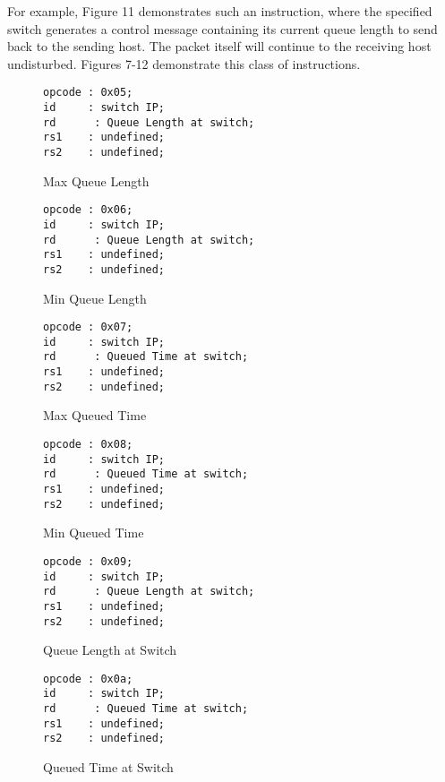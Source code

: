 For example, Figure 11 demonstrates such an instruction, where the specified switch generates a control message containing its current queue length to send back to the sending host. The packet itself will continue to the receiving host undisturbed. Figures 7-12 demonstrate this class of instructions.

\begin{figure}[tp]
\centering
\begin{verbatim}
opcode : 0x05;
id     : switch IP;
rd	    : Queue Length at switch;
rs1	   : undefined;
rs2	   : undefined;
\end{verbatim}
\caption{Max Queue Length}
\end{figure}

\begin{figure}[tp]
\centering
\begin{verbatim}
opcode : 0x06;
id     : switch IP;
rd	    : Queue Length at switch;
rs1	   : undefined;
rs2	   : undefined;
\end{verbatim}
\caption{Min Queue Length}
\end{figure}

\begin{figure}[tp]
\centering
\begin{verbatim}
opcode : 0x07;
id     : switch IP;
rd	    : Queued Time at switch;
rs1	   : undefined;
rs2	   : undefined;
\end{verbatim}
\caption{Max Queued Time}
\end{figure}

\begin{figure}[tp]
\centering
\begin{verbatim}
opcode : 0x08;
id     : switch IP;
rd	    : Queued Time at switch;
rs1	   : undefined;
rs2	   : undefined;
\end{verbatim}
\caption{Min Queued Time}
\end{figure}

\begin{figure}[tp]
\centering
\begin{verbatim}
opcode : 0x09;
id     : switch IP;
rd	    : Queue Length at switch;
rs1	   : undefined;
rs2	   : undefined;
\end{verbatim}
\caption{Queue Length at Switch}
\end{figure}

\begin{figure}[tp]
\centering
\begin{verbatim}
opcode : 0x0a;
id     : switch IP;
rd	    : Queued Time at switch;
rs1	   : undefined;
rs2	   : undefined;
\end{verbatim}
\caption{Queued Time at Switch}
\end{figure}

